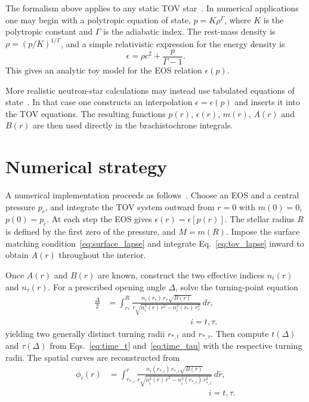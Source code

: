 \documentclass[
  aps,
  prd,
  twocolumn,
  nofootinbib,
  superscriptaddress,
  longbibliography
]{revtex4-2}
\begin{document}
The formalism above applies to any static TOV
star~\cite{ShapiroTeukolsky,Weinberg,MisnerThorneWheeler}.
In numerical applications one may begin with a polytropic equation of state,
$p=K\rho^\Gamma$,
where $K$ is the polytropic constant and $\Gamma$ is the adiabatic
index. The rest-mass density is
$\rho=(p/K)^{1/\Gamma}$,
and a simple relativistic expression for the energy density is
\begin{equation}
\epsilon
=
\rho c^2+\frac{p}{\Gamma-1}.
\end{equation}
This gives an analytic toy model for the EOS relation $\epsilon(p)$.

More realistic neutron-star calculations may instead use tabulated equations of state~\cite{Compose,OertelReview}.
In that case one constructs an interpolation
$\epsilon=\epsilon(p)$ and inserts it into the TOV equations. The
resulting functions $p(r)$, $\epsilon(r)$, $m(r)$, $A(r)$ and $B(r)$
are then used directly in the brachistochrone integrals.

\section{Numerical strategy}

A numerical implementation proceeds as follows~\cite{SilbarReddy2004}. Choose an EOS and a
central pressure $p_c$, and integrate the TOV system outward from
$r=0$ with $m(0)=0$, $p(0)=p_c$. At each step the EOS gives
$\epsilon(r)=\epsilon[p(r)]$. The stellar radius $R$ is defined by
the first zero of the pressure, and $M=m(R)$. Impose the surface
matching condition~\eqref{eq:surface_lapse} and integrate
Eq.~\eqref{eq:tov_lapse} inward to obtain $A(r)$ throughout the
interior.

Once $A(r)$ and $B(r)$ are known, construct the two effective indices
$n_t(r)$ and $n_\tau(r)$. For a prescribed opening angle $\Delta$,
solve the turning-point equation
\begin{align}
\frac{\Delta}{2}
&=
\int_{r_*}^{R}
\frac{
n_i(r_*)\,r_*\sqrt{B(r)}
}{
r\sqrt{
n_i^2(r)\,r^2
-
n_i^2(r_*)\,r_*^2
}
}
\,dr,
\nonumber\\
&\hspace{10em}
i=t,\tau.
\label{eq:turning_general}
\end{align}
yielding two generally distinct turning radii $r_{*,t}$ and
$r_{*,\tau}$. Then compute $t(\Delta)$ and $\tau(\Delta)$ from
Eqs.~\eqref{eq:time_t} and~\eqref{eq:time_tau} with the respective
turning radii. The spatial curves are reconstructed from
\begin{align}
\phi_i(r)
&=
\int_{r_{*,i}}^{r}
\frac{
n_i(r_{*,i})\,r_{*,i}\sqrt{B(\bar{r})}
}{
\bar{r}\sqrt{
n_i^2(\bar{r})\,\bar{r}^2
-
n_i^2(r_{*,i})\,r_{*,i}^2
}
}
\,d\bar{r},
\nonumber\\
&\hspace{12em}
i=t,\tau.
\label{eq:curve_reconstruction}
\end{align}
\end{document}
